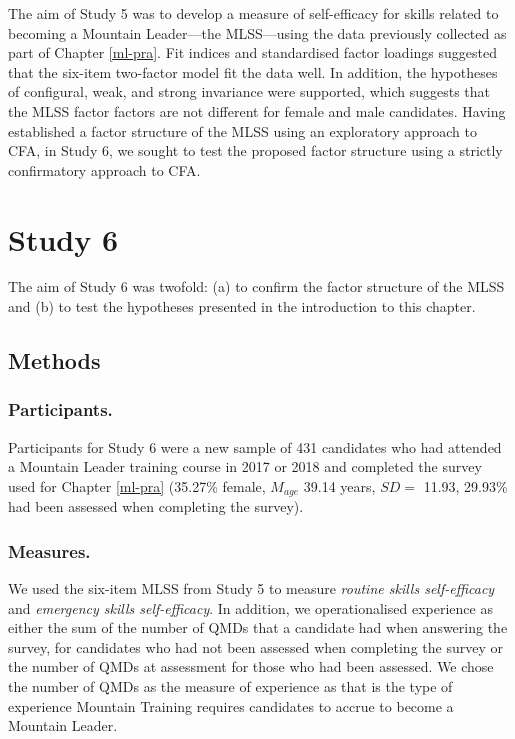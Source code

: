 \documentclass[
  12pt,
  a4paper,
]{book}
\begin{document}
The aim of Study 5 was to develop a measure of self-efficacy for skills related to becoming a Mountain Leader---the MLSS---using the data previously collected as part of Chapter \ref{ml-pra}. Fit indices and standardised factor loadings suggested that the six-item two-factor model fit the data well. In addition, the hypotheses of configural, weak, and strong invariance were supported, which suggests that the MLSS factor factors are not different for female and male candidates. Having established a factor structure of the MLSS using an exploratory approach to CFA, in Study 6, we sought to test the proposed factor structure using a strictly confirmatory approach to CFA.

\hypertarget{study-6}{%
\section{Study 6}\label{study-6}}

The aim of Study 6 was twofold: (a) to confirm the factor structure of the MLSS and (b) to test the hypotheses presented in the introduction to this chapter.

\hypertarget{study-6-methods}{%
\subsection{Methods}\label{study-6-methods}}

\hypertarget{study-6-participants}{%
\subsubsection{Participants.}\label{study-6-participants}}

Participants for Study 6 were a new sample of 431 candidates who had attended a Mountain Leader training course in 2017 or 2018 and completed the survey used for Chapter \ref{ml-pra} (35.27\% female, \(M_{age}\) 39.14 years, \(SD =\) 11.93, 29.93\% had been assessed when completing the survey).

\hypertarget{study-6-measures}{%
\subsubsection{Measures.}\label{study-6-measures}}

We used the six-item MLSS from Study 5 to measure \emph{routine skills self-efficacy} and \emph{emergency skills self-efficacy}. In addition, we operationalised experience as either the sum of the number of QMDs that a candidate had when answering the survey, for candidates who had not been assessed when completing the survey or the number of QMDs at assessment for those who had been assessed. We chose the number of QMDs as the measure of experience as that is the type of experience Mountain Training requires candidates to accrue to become a Mountain Leader.
\end{document}
